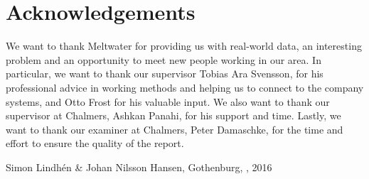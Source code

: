 \thispagestyle{plain}			%
\section*{Acknowledgements}
We want to thank Meltwater for providing us with real-world data, an interesting problem and an opportunity to meet new people working in our area. In particular, we want to thank our supervisor Tobias Ara Svensson, for his professional advice in working methods and helping us to connect to the company systems, and Otto Frost for his valuable input. We also want to thank our supervisor at Chalmers, Ashkan Panahi, for his support and time. Lastly, we want to thank our examiner at Chalmers, Peter Damaschke, for the time and effort to ensure the quality of the report.

\vspace{1.5cm}
\hfill
Simon Lindhén \& Johan Nilsson Hansen, Gothenburg, \monthname, 2016

\newpage				%
\thispagestyle{empty}
\mbox{}